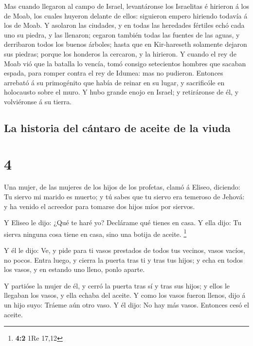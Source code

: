  Mas cuando llegaron al campo de Israel, levantáronse los
Israelitas é hirieron á los de Moab, los cuales huyeron delante de
ellos: siguieron empero hiriendo todavía á los de Moab.  Y
asolaron las ciudades, y en todas las heredades fértiles echó cada uno
su piedra, y las llenaron; cegaron también todas las fuentes de las
aguas, y derribaron todos los buenos árboles; hasta que en Kir-hareseth
solamente dejaron sus piedras; porque los honderos la cercaron, y la
hirieron.  Y cuando el rey de Moab vió que la batalla lo
vencía, tomó consigo setecientos hombres que sacaban espada, para romper
contra el rey de Idumea: mas no pudieron.  Entonces
arrebató á su primogénito que había de reinar en su lugar, y sacrificóle
en holocausto sobre el muro. Y hubo grande enojo en Israel; y
retiráronse de él, y volviéronse á su tierra.

\hypertarget{la-historia-del-cuxe1ntaro-de-aceite-de-la-viuda}{%
\subsection{La historia del cántaro de aceite de la
viuda}\label{la-historia-del-cuxe1ntaro-de-aceite-de-la-viuda}}

\hypertarget{section-3}{%
\section{4}\label{section-3}}

 Una mujer, de las mujeres de los hijos de los profetas,
clamó á Eliseo, diciendo: Tu siervo mi marido es muerto; y tú sabes que
tu siervo era temeroso de Jehová: y ha venido el acreedor para tomarse
dos hijos míos por siervos.

 Y Eliseo le dijo: ¿Qué te haré yo? Declárame qué tienes en
casa. Y ella dijo: Tu sierva ninguna cosa tiene en casa, sino una botija
de aceite. \footnote{\textbf{4:2} 1Re 17,12}

 Y él le dijo: Ve, y pide para ti vasos prestados de todos
tus vecinos, vasos vacíos, no pocos.  Entra luego, y cierra
la puerta tras ti y tras tus hijos; y echa en todos los vasos, y en
estando uno lleno, ponlo aparte.

 Y partióse la mujer de él, y cerró la puerta tras sí y tras
sus hijos; y ellos le llegaban los vasos, y ella echaba del aceite.
 Y como los vasos fueron llenos, dijo á un hijo suyo: Tráeme
aún otro vaso. Y él dijo: No hay más vasos. Entonces cesó el aceite.

